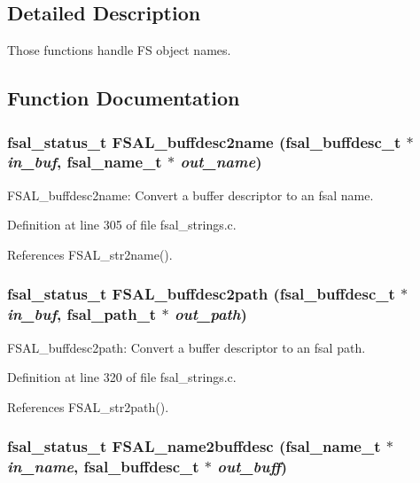 \subsection{Detailed Description}
Those functions handle FS object names. 

\subsection{Function Documentation}
\subsubsection{\setlength{\rightskip}{0pt plus 5cm}fsal\_\-status\_\-t FSAL\_\-buffdesc2name (fsal\_\-buffdesc\_\-t $\ast$ {\em in\_\-buf}, fsal\_\-name\_\-t $\ast$ {\em out\_\-name})}\label{group__FSALNameFunctions_ga8}


FSAL\_\-buffdesc2name: Convert a buffer descriptor to an fsal name. 

Definition at line 305 of file fsal\_\-strings.c.

References FSAL\_\-str2name().
\subsubsection{\setlength{\rightskip}{0pt plus 5cm}fsal\_\-status\_\-t FSAL\_\-buffdesc2path (fsal\_\-buffdesc\_\-t $\ast$ {\em in\_\-buf}, fsal\_\-path\_\-t $\ast$ {\em out\_\-path})}\label{group__FSALNameFunctions_ga9}


FSAL\_\-buffdesc2path: Convert a buffer descriptor to an fsal path. 

Definition at line 320 of file fsal\_\-strings.c.

References FSAL\_\-str2path().
\subsubsection{\setlength{\rightskip}{0pt plus 5cm}fsal\_\-status\_\-t FSAL\_\-name2buffdesc (fsal\_\-name\_\-t $\ast$ {\em in\_\-name}, fsal\_\-buffdesc\_\-t $\ast$ {\em out\_\-buff})}\label{group__FSALNameFunctions_ga11}


